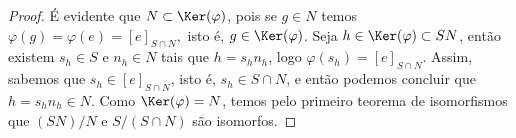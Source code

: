 \begin{proof}
    É evidente que \(N \subset \Ker(\varphi)\), pois se \(g \in N\) temos \(\varphi(g) = \varphi(e) = [e]_{S\cap N},\) isto é, \(g \in \Ker(\varphi)\). Seja \(h \in \Ker(\varphi) \subset SN\), então existem \(s_h \in S\) e \(n_h \in N\) tais que \(h = s_h n_h\), logo \(\varphi(s_h) = [e]_{S \cap N}\). Assim, sabemos que \(s_h \in [e]_{S \cap N}\), isto é, \(s_h \in S \cap N\), e então podemos concluir que \(h = s_h n_h \in N\). Como \(\Ker(\varphi) = N\), temos pelo primeiro teorema de isomorfismos que \((SN)/N\) e \(S/(S\cap N)\) são isomorfos.
\end{proof}
